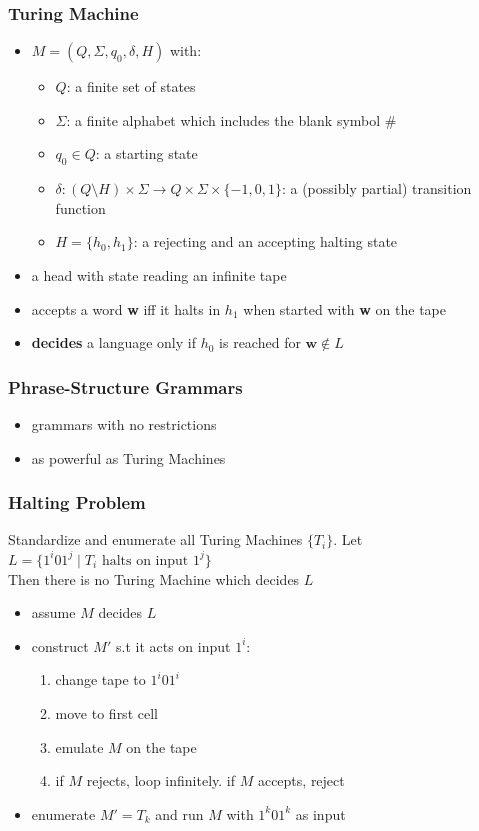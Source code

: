 \documentclass{beamer}
\begin{document}
\begin{frame}
\frametitle{Turing Machine}
\begin{itemize}
\item $M = (Q, \Sigma, q_0, \delta, H)$ with:
  \begin{itemize}
  \item $Q$: a finite set of states
  \item $\Sigma$: a finite alphabet which includes the blank symbol \#
  \item $q_0 \in Q$: a starting state
  \item $\delta: (Q \setminus H) \times \Sigma \rightarrow Q \times \Sigma
    \times \{-1, 0, 1\}$: a (possibly partial) transition function
  \item $H = \{h_0, h_1\}$: a rejecting and an accepting halting state
  \end{itemize}
\item a head with state reading an infinite tape
\item accepts a word \textbf{w} iff it halts in $h_1$ when started with \textbf{w} on the tape
\item \textbf{decides} a language only if $h_0$ is reached for $\mathbf{w} \not\in L$
\end{itemize}
\end{frame}


\begin{frame}
\frametitle{Phrase-Structure Grammars}
\begin{itemize}
  \item grammars with no restrictions
  \item as powerful as Turing Machines
\end{itemize}
\end{frame}


\begin{frame}
\frametitle{Halting Problem}
\begin{theorem}
  Standardize and enumerate all Turing Machines $\{T_i\}$. Let $L = \{1^i01^j
  \mid T_i \text{ halts on input } 1^j\}$\\
  Then there is no Turing Machine which decides $L$
\end{theorem}
\begin{itemize}
\item assume $M$ decides $L$
\item construct $M'$ s.t it acts on input $1^i$:
  \begin{enumerate}
  \item change tape to $1^i01^i$
  \item move to first cell
  \item emulate $M$ on the tape
  \item if $M$ rejects, loop infinitely. if $M$ accepts, reject
  \end{enumerate}
\item enumerate $M' = T_k$ and run $M$ with $1^k01^k$ as input 
\end{itemize}
\end{frame}
\end{document}
